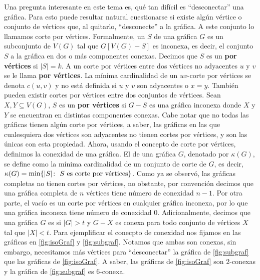 Una pregunta interesante en este tema es, qu\'e tan dif\'icil es ``desconectar''
una gr\'afica. Para esto puede resultar natural cuestionarse si existe alg\'un
v\'ertice o conjunto de v\'ertices que, al quitarlo, ``desconecte'' a la
gr\'afica. A este conjunto lo llamamos corte por v\'ertices. Formalmente, un
 $S$ de una gr\'afica $G$
es un subconjunto de $V(G)$ tal que $G[V(G)-S]$ es inconexa, es decir, el
conjunto $S$  a la gr\'afica en dos o m\'as componentes conexas.
Decimos que $S$ es un  \textbf{por v\'ertices} si
$|S|=k$. A un corte por v\'ertices entre dos v\'ertices no adyacentes $u$ y $v$
se le llama  \textbf{por v\'ertices}. La
m\'inima cardinalidad de un $uv$-corte por v\'ertices se denota $c(u,v)$ y no
est\'a definida si $u$ y $v$ son adyacentes o $x=y$. Tambi\'en pueden existir
cortes por v\'ertices entre dos conjuntos de v\'ertices. Sean $X,Y \subseteq
V(G)$, $S$ es un  \textbf{por v\'ertices} si
$G-S$ es una gr\'afica inconexa donde $X$ y $Y$ se encuentran en distintas
componentes conexas. Cabe notar que no todas las gr\'aficas tienen alg\'un corte
por v\'ertices, a saber, las gr\'aficas en las que cualesquiera dos v\'ertices
son adyacentes no tienen cortes por v\'ertices, y son las \'unicas con esta
propiedad. Ahora, usando el concepto de corte por v\'ertices, definimos la
conexidad de una gr\'afica. El  de una gr\'afica
$G$, denotado por $\kappa(G)$, se define como la m\'inima cardinalidad de un
conjunto de corte de $G$, es decir, $\kappa(G)=\min \{|S| \colon\ S \textnormal{
es corte por v\'ertices}\}$. Como ya se observ\'o, las gr\'aficas completas no
tienen cortes por v\'ertices, no obstante, por convenci\'on decimos que una
gr\'afica completa de $n$ v\'ertices tiene n\'umero de conexidad $n-1$. Por otra
parte, el vac\'io es un corte por v\'ertices en cualquier gr\'afica inconexa,
por lo que una gr\'afica inconexa tiene n\'umero de conexidad $0$.
Adicionalmente, decimos que una gr\'afica $G$ es
 si $|G|>t$ y $G-X$ es conexa para todo
conjunto de v\'ertices $X$ tal que $|X|<t$. Para ejemplificar el conecpto de
conexidad nos fijamos en las gr\'aficas en \cref{fig:isoGraf} y
\cref{fig:subgraf}. Notamos que ambas son conexas, sin embargo, necesitamos
m\'as v\'ertices para ``desconectar'' la gr\'afica de \cref{fig:subgraf} que las
gr\'aficas de \cref{fig:isoGraf}. A saber, las gr\'aficas de \cref{fig:isoGraf}
son $2$-conexas y la gr\'afica de \cref{fig:subgraf} es $6$-conexa.

